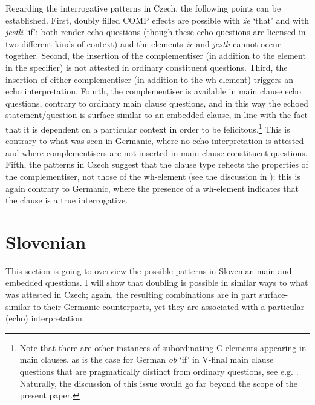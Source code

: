 \documentclass[output=paper,
modfonts, hidelinks, newtxmath
]{langscibook}
\begin{document}
\ea
	\z 
\z 

\noindent Regarding the interrogative patterns in Czech, the following points can be established. First, doubly filled COMP effects are possible with \textit{že} `that' and with \textit{jestli} `if': both render echo questions (though these echo questions are licensed in two different kinds of context) and the elements \textit{že} and \textit{jestli} cannot occur together. Second, the insertion of the complementiser (in addition to the element in the specifier) is not attested in ordinary constituent questions. Third, the insertion of either complementiser (in addition to the wh-element) triggers an echo interpretation. Fourth, the complementiser is available in main clause echo questions, contrary to ordinary main clause questions, and in this way the echoed statement/question is surface-similar to an embedded clause, in line with the fact that it is dependent on a particular context in order to be felicitous.\footnote{Note that there are other instances of subordinating C-elements appearing in main clauses, as is the case for German \textit{ob} `if' in V-final main clause questions that are pragmatically distinct from ordinary questions, see e.g. \citet{zimmermann2013}. Naturally, the discussion of this issue would go far beyond the scope of the present paper.} This is contrary to what was seen in Germanic, where no echo interpretation is attested and where complementisers are not inserted in main clause constituent questions. Fifth, the patterns in Czech suggest that the clause type reflects the properties of the complementiser, not those of the wh-element (see the discussion in ); this is again contrary to Germanic, where the presence of a wh-element indicates that the clause is a true interrogative.

\section{Slovenian}
This section is going to overview the possible patterns in Slovenian main and embedded questions. I will show that doubling is possible in similar ways to what was attested in Czech; again, the resulting combinations are in part surface-similar to their Germanic counterparts, yet they are associated with a particular (echo) interpretation.
\end{document}
